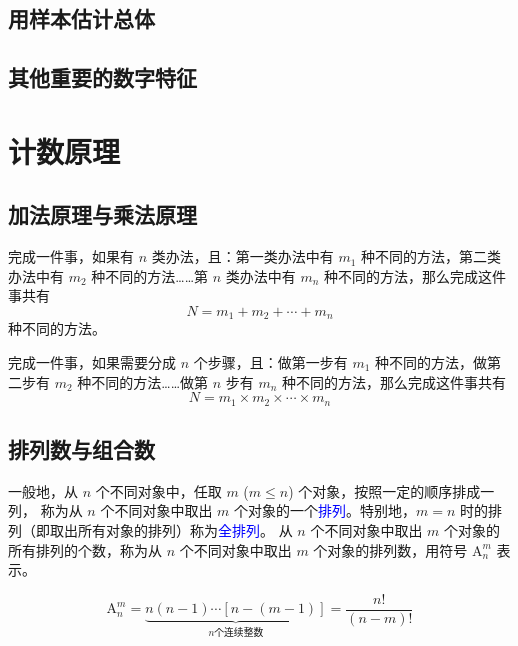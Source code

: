 \subsection{用样本估计总体}
\clearpage
\subsection{其他重要的数字特征}
\clearpage


\section{计数原理}
\subsection{加法原理与乘法原理}
\begin{theorem}[分类加法计数原理]
    完成一件事，如果有 $n$ 类办法，且：第一类办法中有 $m_1$ 种不同的方法，第二类办法中有 $m_2$ 种不同的方法……第 $n$ 类办法中有 $m_n$ 种不同的方法，那么完成这件事共有
    \[ N = m_1 + m_2 + \cdots + m_n \]
    种不同的方法。
\end{theorem}
\begin{theorem}
    完成一件事，如果需要分成 $n$ 个步骤，且：做第一步有 $m_1$ 种不同的方法，做第二步有 $m_2$ 种不同的方法……做第 $n$ 步有 $m_n$ 种不同的方法，那么完成这件事共有
\[ N = m_1 \times m_2 \times \cdots \times m_n \]
\end{theorem}
\clearpage
\subsection{排列数与组合数}
\begin{definition}
    一般地，从 \( n \) 个不同对象中，任取 \( m \) (\( m \leq n \)) 个对象，按照一定的顺序排成一列，
    称为从 \( n \) 个不同对象中取出 \( m \) 个对象的一个\textcolor{blue}{排列}。特别地，\( m = n \) 时的排列（即取出所有对象的排列）称为\textcolor{blue}{全排列}。
    从 \( n \) 个不同对象中取出 \( m \) 个对象的所有排列的个数，称为从 \( n \) 个不同对象中取出 \( m \) 个对象的排列数，用符号 \( \mathrm{A}_n^m \) 表示。
\end{definition}

\begin{theorem}
    \[\mathrm{A}_n^m=\underbrace{ n(n-1)\cdots[n-(m-1)]}_{n\text{个连续整数}}=\frac{n!}{(n-m)!}\]
\end{theorem}

